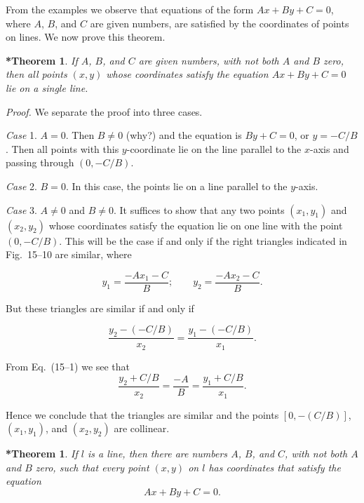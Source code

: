\documentclass[11pt]{book}
\theoremstyle{bkplain}
\theoremstyle{XIplainnote}
\theoremstyle{bkplain}
\theoremstyle{bkplain}
\newtheorem{XVstheorem}[theorem]{*Theorem}
\begin{document}
From the examples we observe that equations of the form $Ax + By + C = 0$,
where $A$, $B$, and $C$ are given numbers, are satisfied by the coordinates of
points on lines. We now prove this theorem.

\begin{XVstheorem}
If $A$, $B$, and $C$ are given numbers, with not both $A$ and $B$ zero, then
all points $(x, y)$ whose coordinates satisfy the equation $Ax + By + C = 0$
lie on a single line.
\end{XVstheorem}

\noindent\emph{Proof.}
We separate the proof into three cases.

\emph{Case} 1. $A = 0$. Then $B \neq 0$ (why?) and the equation is
$By + C = 0$, or $y = -C/B$. Then all points with this $y$-coordinate lie on
the line parallel to the $x$-axis and passing through $(0, -C/B)$.

\emph{Case} 2. $B = 0$. In this case, the points lie on a line parallel to the
$y$-axis.

\emph{Case} 3. $A \neq 0$ and $B \neq 0$. It suffices to show that any two
points $(x_1, y_1)$ and $(x_2, y_2)$ whose coordinates satisfy the equation
lie on one line with the point $(0, -C/B)$. This will be the case if and only
if the right triangles indicated in Fig.~15--10 are similar, where

\begin{equation}\tag{15--1}
y_1 = \frac{-Ax_1-C}{B}; \qquad y_2 = \frac{-Ax_2-C}{B}.
\end{equation}

\FIGXVTENELEVEN

But these triangles are similar if and only if

\begin{equation}\tag{15--2}
\frac{y_2-(-C/B)}{x_2} = \frac{y_1-(-C/B)}{x_1}.
\end{equation}

From Eq.~(15--1) we see that
\[
\frac{y_2+C/B}{x_2} = \frac{-A}{B} = \frac{y_1+C/B}{x_1}.
\]

Hence we conclude that the triangles are similar and the points
$[0, -(C/B)]$, $(x_1, y_1)$, and $(x_2, y_2)$ are collinear.

\begin{XVstheorem}
If $l$ is a line, then there are numbers $A$, $B$, and $C$, with not both $A$
and $B$ zero, such that every point $(x, y)$ on $l$ has coordinates that
satisfy the equation
\begin{equation}\tag{15--3}
Ax + By + C = 0.
\end{equation}
\end{XVstheorem}
\end{document}
